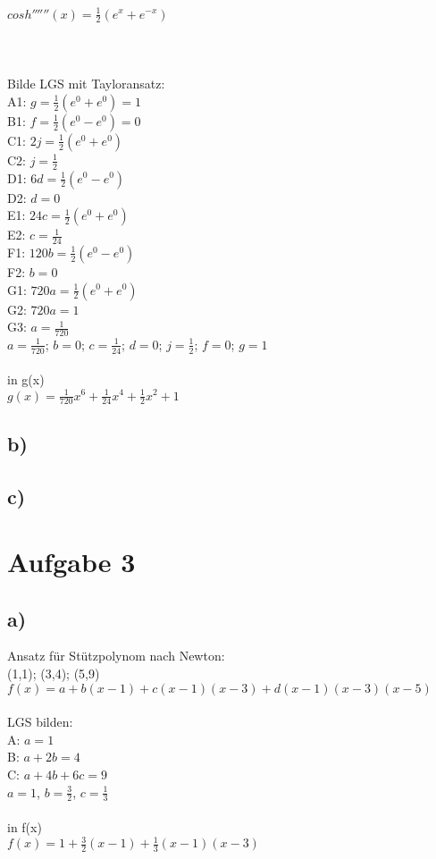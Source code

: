 \documentclass{article}
\begin{document}
	$cosh''''''(x) = \frac{1}{2}(e^x + e^{-x})$ \\ \\ \\ \\
	Bilde LGS mit Tayloransatz: \\
	A1: $g = \frac{1}{2}(e^0 + e^0) = 1$  \\
	B1: $f = \frac{1}{2}(e^0 - e^0) = 0 $ \\
	C1: $ 2j = \frac{1}{2}(e^0 + e^0)$ \\
	C2: $j = \frac{1}{2}$ \\
	D1: $6d = \frac{1}{2}(e^0 - e^0)$\\
	D2: $d = 0$\\
	E1: $24c = \frac{1}{2}(e^0 + e^0)$\\
	E2: $c = \frac{1}{24}$ \\
	F1: $120b =  \frac{1}{2}(e^0 - e^0)$ \\
	F2: $b = 0$ \\
	G1: $720a =  \frac{1}{2}(e^0 + e^0) $\\
	G2: $720a =  1 $\\
	G3: $a = \frac{1}{720} $\\
	$a = \frac{1}{720}$; $b = 0$; $c = \frac{1}{24}$; $d = 0$; $j = \frac{1}{2}$; $f = 0$; $g = 1$ \\ \\
	in g(x) \\
	$g(x) =  \frac{1}{720}x^6  + \frac{1}{24}x^4 + \frac{1}{2}x^2 + 1$
	\subsection*{b)}
	\subsection*{c)}
	\section*{Aufgabe 3}
	\subsection*{a)}
	Ansatz für Stützpolynom nach Newton: \\
	(1,1); (3,4); (5,9) \\
	$f(x) = a + b(x-1) + c(x-1)(x-3) + d(x-1)(x-3)(x-5)$ \\ \\
	LGS bilden: \\
	A: $a = 1$ \\
	B: $a + 2b  = 4$ \\
	C: $a + 4b + 6c = 9$ \\
	$a = 1$, $b = \frac{3}{2}$, $c = \frac{1}{3}$ \\ \\
	in f(x) \\
	$f(x) = 1 + \frac{3}{2}(x-1) + \frac{1}{3}(x-1)(x-3)$ \\
\end{document}
